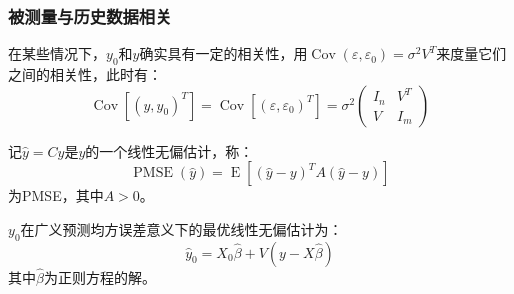 \subsubsection{被测量与历史数据相关}
\begin{derivation}
	在某些情况下，$y_0$和$y$确实具有一定的相关性，用$\operatorname{Cov}(\varepsilon,\varepsilon_0)=\sigma^2V^T$来度量它们之间的相关性，此时有：
	\begin{equation*}
		\operatorname{Cov}[(y,y_0)^T]=\operatorname{Cov}[(\varepsilon,\varepsilon_0)^T]=\sigma^2
		\begin{pmatrix}
			I_n & V^T \\
			V & I_m 
		\end{pmatrix}
	\end{equation*}
\end{derivation}
\begin{definition}
	记$\hat{y}=Cy$是$y$的一个线性无偏估计，称：
	\begin{equation*}
		\operatorname{PMSE}(\hat{y})=\operatorname{E}[(\hat{y}-y)^TA(\hat{y}-y)]
	\end{equation*}
	为\gls{PMSE}，其中$A>0$。
\end{definition}
\begin{theorem}\label{theo:PECorrelatedLinearModelForcast}
	$y_0$在广义预测均方误差意义下的最优线性无偏估计为：
	\begin{equation*}
		\hat{y}_0=X_0\hat{\beta}+V(y-X\hat{\beta})
	\end{equation*}
	其中$\hat{\beta}$为正则方程的解。
\end{theorem}
